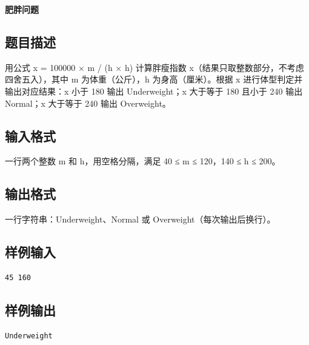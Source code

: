 \documentclass{article}
\newcommand{\problemname}[1]{\begin{center}\Large\bfseries #1\end{center}}
\begin{document}
\problemname{肥胖问题}

\subsection*{题目描述}
用公式 x = 100000 × m / (h × h) 计算胖瘦指数 x（结果只取整数部分，不考虑四舍五入），其中 m 为体重（公斤），h 为身高（厘米）。根据 x 进行体型判定并输出对应结果：x 小于 180 输出 Underweight；x 大于等于 180 且小于 240 输出 Normal；x 大于等于 240 输出 Overweight。

\subsection*{输入格式}
一行两个整数 m 和 h，用空格分隔，满足 40 ≤ m ≤ 120，140 ≤ h ≤ 200。

\subsection*{输出格式}
一行字符串：Underweight、Normal 或 Overweight（每次输出后换行）。

\subsection*{样例输入}
\begin{verbatim}
45 160
\end{verbatim}

\subsection*{样例输出}
\begin{verbatim}
Underweight
\end{verbatim}
\end{document}
